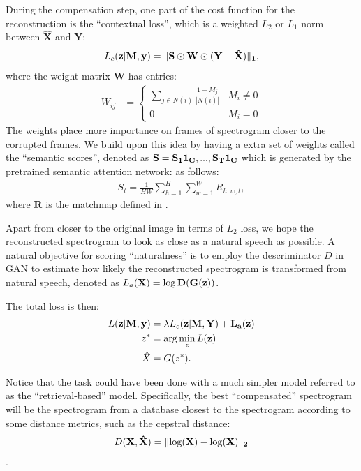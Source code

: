 \documentclass[a4paper]{article}
\begin{document}
During the compensation step,
one part of the cost function for the reconstruction is the ``contextual loss'', which is a
weighted $L_2$ or $L_1$ norm between $\hat{\mathbf{X}}$ and $\mathbf{Y}$:
\begin{align}
\label{eq:context_loss}
    L_c(\mathbf{z}|\mathbf{M}, \mathbf{y}) = \lVert \bf{S} \odot \bf{W} \odot ( \mathbf{Y} - \hat{\mathbf{X}})\rVert_1,
\end{align}
where the weight matrix $\mathbf{W}$ has entries:
\begin{align}
W_{ij} &= 
\begin{cases}
     \sum_{j \in N(i)} \frac{1 - M_j}{|N(i)|} & M_i \neq 0 \\
     0 & M_i = 0
\end{cases}
\end{align}
The weights place more importance
 on frames of spectrogram closer to the corrupted frames. We build upon this idea by having a extra set
 of weights called the ``semantic scores'', denoted as $\bf{S} = S_1\bf{1}_C, ..., S_T\bf{1}_C$ which is generated by the pretrained semantic attention network:
 as follows:
 \begin{align}
     S_t = \frac{1}{HW}\sum_{h=1}^{H}\sum_{w=1}^{W} R_{h,w,t},
 \end{align}
 where $\mathbf{R}$ is the matchmap defined in \cite{Harwath18}.

Apart from closer to the original
image in terms of $L_2$ loss, we hope the reconstructed spectrogram 
to look as close as a natural speech as possible. A natural objective
for scoring ``naturalness'' is to employ
the descriminator $D$ in GAN to estimate how likely
the reconstructed spectrogram is transformed from natural speech, 
denoted as $L_a(\bf{X}) = \log D(G(\bf{z}))$.

The total loss is then:
\begin{align}
    L(\bf{z}|\bf{M}, \bf{y}) &= \lambda L_c(\bf{z}|\bf{M}, \bf{Y}) + L_a(\bf{z})     \\
    z^* &= \arg \min_z L(\bf{z})\\
    \hat{X} &= G(z^*).
\end{align}

Notice that the task could have been done with a much simpler model
referred to as the ``retrieval-based'' model. Specifically, the 
best ``compensated'' spectrogram will be the spectrogram from 
a database closest to the spectrogram according to some distance 
metrics, such as the cepstral distance:
\begin{align}
    D(\bf{X}, \hat{\bf{X}}) = \lVert \log (\bf{X}) - \log (\bf{X})\rVert_2
\end{align}.
\end{document}
